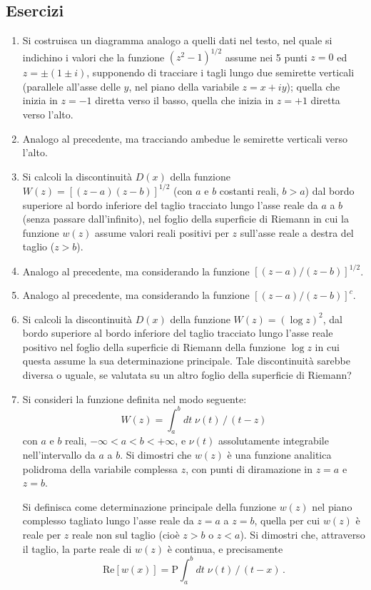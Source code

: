 \documentclass[11pt, a4paper]{book}
\numberwithin{equation}{section}
\newenvironment{esercizi}{\subsection*{Esercizi}\begin{enumerate}}{\end{enumerate}}
\begin{document}
\begin{esercizi}
\item Si costruisca un diagramma analogo a quelli dati nel testo, nel quale si
    indichino i valori che la funzione $(z^2-1)^{1/2}$ assume nei 5 punti $z=0$
    ed $z = \pm(1 \pm i)$, supponendo di tracciare i tagli lungo due semirette
    verticali (parallele all'asse delle $y$, nel piano della variabile $z = x + iy$);
    quella che inizia in $z=-1$ diretta verso il basso, quella che inizia in
    $z=+1$ diretta verso l'alto.

\item Analogo al precedente, ma tracciando ambedue le semirette verticali verso l'alto.

\item Si calcoli la discontinuità $D(x)$ della funzione
    $W(z) = \left[(z-a)(z-b)\right]^{1/2}$
    (con $a$ e $b$ costanti reali, $b > a$) dal bordo superiore al bordo inferiore
    del taglio tracciato lungo l'asse reale da $a$ a $b$ (senza passare dall'infinito),
    nel foglio della superficie di Riemann in cui la funzione $w(z)$ assume
    valori reali positivi per $z$ sull'asse reale a destra del taglio ($z > b$).

\item Analogo al precedente, ma considerando la funzione $\left[(z-a)/(z-b)\right]^{1/2}$.

\item Analogo al precedente, ma considerando la funzione $\left[(z-a)/(z-b)\right]^{c}$.

\item Si calcoli la discontinuità $D(x)$ della funzione $W(z) = (\log z)^2$,
    dal bordo superiore al bordo inferiore del taglio tracciato lungo l'asse
    reale positivo nel foglio della superficie di Riemann della funzione $\log z$
    in cui questa assume la sua determinazione principale. Tale discontinuità
    sarebbe diversa o uguale, se valutata su un altro foglio della superficie
    di Riemann?

\item Si consideri la funzione definita nel modo seguente:
    \[
        W(z) = \int_a^b dt\; \nu(t) \,/\, (t - z)
    \]
    con $a$ e $b$ reali, $-\infty < a < b < +\infty$, e $\nu(t)$ assolutamente
    integrabile nell'intervallo da $a$ a $b$. Si dimostri che $w(z)$ è una
    funzione analitica polidroma della variabile complessa $z$, con punti di
    diramazione in $z=a$ e $z=b$.

    Si definisca come determinazione principale della funzione $w(z)$ nel piano
    complesso tagliato lungo l'asse reale da $z=a$ a $z=b$, quella per cui
    $w(z)$ è reale per $z$ reale non sul taglio (cioè $z > b$ o $z < a$). Si
    dimostri che, attraverso il taglio, la parte reale di $w(z)$ è continua, e
    precisamente
    \[
        \mathrm{Re}\left[w(x)\right] = \mathrm{P} \int_a^b dt\; \nu(t) \,/\, (t - x) \,.
    \]
\end{esercizi}
\end{document}

